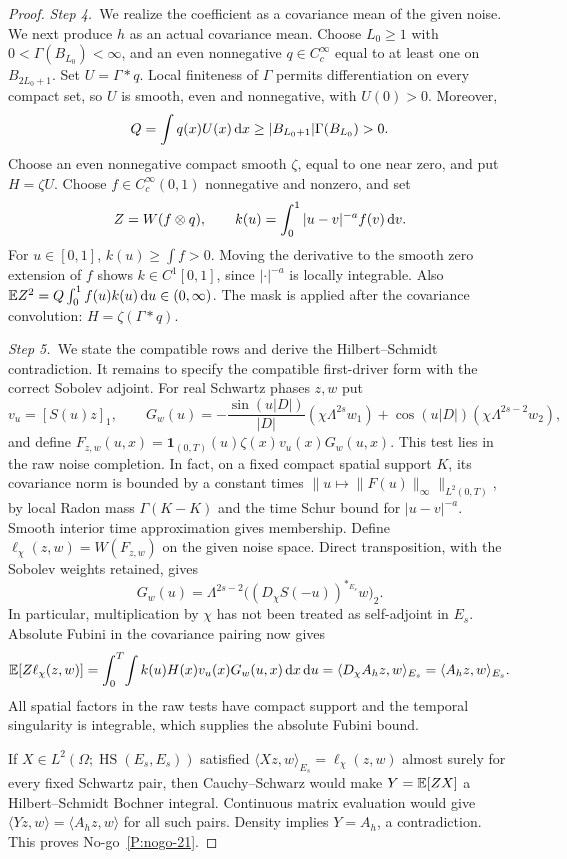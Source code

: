 \begin{proof}
  \medskip
  \noindent\textit{Step 4.~}We realize the coefficient as a covariance mean of
  the given noise.
  We next produce $h$ as an actual covariance mean. Choose $L_0\ge1$ with
  $0<\Gamma(B_{L_0})<\infty$, and an even nonnegative $q\in C_c^\infty$
  equal to at least one on $B_{2L_0+1}$. Set $U=\Gamma*q$. Local finiteness
  of $\Gamma$ permits differentiation on every compact set, so $U$ is smooth,
  even and nonnegative, with $U(0)>0$. Moreover,
  \[
    Q=\int q(x)U(x)\,\mathrm{d} x
    \ge |B_{L_0+1}|\Gamma(B_{L_0})>0.
  \]
  Choose an even nonnegative compact smooth $\zeta$, equal to one near zero,
  and put $H=\zeta U$. Choose $f\in C_c^\infty(0,1)$ nonnegative and
  nonzero, and set
  \[
    Z=W(f\otimes q),\qquad
    k(u)=\int_0^1|u-v|^{-a}f(v)\,\mathrm{d} v.
  \]
  For $u\in[0,1]$, $k(u)\ge\int f>0$. Moving the derivative to the smooth
  zero extension of $f$ shows $k\in C^1[0,1]$, since $|\cdot|^{-a}$ is
  locally integrable. Also $\mathbb{E} Z^2=Q\int_0^1 f(u)k(u)\,\mathrm{d} u\in(0,\infty)$.
  The mask is applied after the covariance convolution: $H=\zeta(\Gamma*q)$.


  \medskip
  \noindent\textit{Step 5.~}We state the compatible rows and derive the
  Hilbert--Schmidt contradiction.
  It remains to specify the compatible first-driver form with the correct
  Sobolev adjoint. For real Schwartz phases $z,w$ put
  \[
    v_u=[S(u)z]_1,\qquad
    G_w(u)=-\frac{\sin(u|D|)}{|D|}(\chi\Lambda^{2s}w_1)
    +\cos(u|D|)(\chi\Lambda^{2s-2}w_2),
  \]
  and define
  $F_{z,w}(u,x)=\mathbf1_{(0,T)}(u)\zeta(x)v_u(x)G_w(u,x)$.
  This test lies in the raw noise completion. In fact, on a fixed compact
  spatial support $K$, its covariance norm is bounded by a constant times
  $\|u\mapsto\|F(u)\|_\infty\|_{L^2(0,T)}$, by local Radon mass
  $\Gamma(K-K)$ and the time Schur bound for $|u-v|^{-a}$. Smooth interior
  time approximation gives membership. Define
  $\ell_\chi(z,w)=W(F_{z,w})$ on the given noise space.
  Direct transposition, with the Sobolev weights retained, gives
  \[
    G_w(u)=\Lambda^{2s-2}
    \big((D_\chi S(-u))^{*_{E_s}}w\big)_2.
  \]
  In particular, multiplication by $\chi$ has not been treated as self-adjoint
  in $E_s$. Absolute Fubini in the covariance pairing now gives
  \[
    \mathbb{E}[Z\ell_\chi(z,w)]
    =\int_0^T\!\int k(u)H(x)v_u(x)G_w(u,x)\,\mathrm{d} x\,\mathrm{d} u
    =\langle D_\chi A_hz,w\rangle_{E_s}
    =\langle A_hz,w\rangle_{E_s}.
  \]
  All spatial factors in the raw tests have compact support and the temporal
  singularity is integrable, which supplies the absolute Fubini bound.

  If $X\in L^2(\Omega;\operatorname{HS}(E_s,E_s))$ satisfied
  $\langle Xz,w\rangle_{E_s}=\ell_\chi(z,w)$ almost surely for every fixed
  Schwartz pair, then Cauchy--Schwarz would make
  $Y=\mathbb{E}[ZX]$ a Hilbert--Schmidt Bochner integral. Continuous matrix evaluation
  would give $\langle Yz,w\rangle=\langle A_hz,w\rangle$ for all such pairs.
  Density implies $Y=A_h$, a contradiction. This proves No-go~\ref{P:nogo-21}.
\end{proof}

